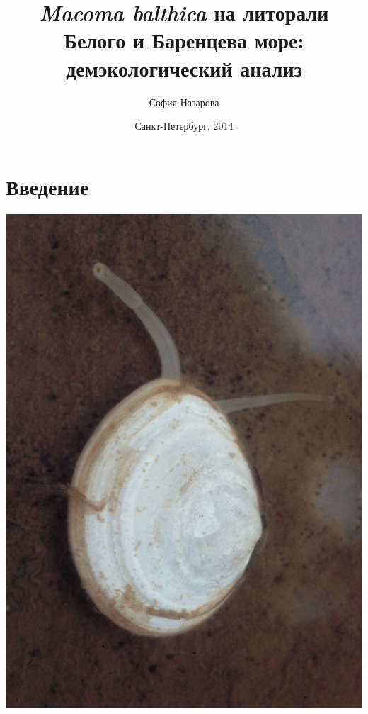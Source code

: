\documentclass{beamer}
\begin{document}
\title{{\it Macoma balthica} на литорали Белого и Баренцева море: демэкологический анализ}  
\author{София Назарова}
\date{Санкт-Петербург, 2014} 
\frame{\titlepage} 


\section*{Введение}

\begin{frame}{}
 \begin{center}
\includegraphics{Macoma_balthica.jpg}
 \end{center}
 
 \end{frame}
\end{document}

